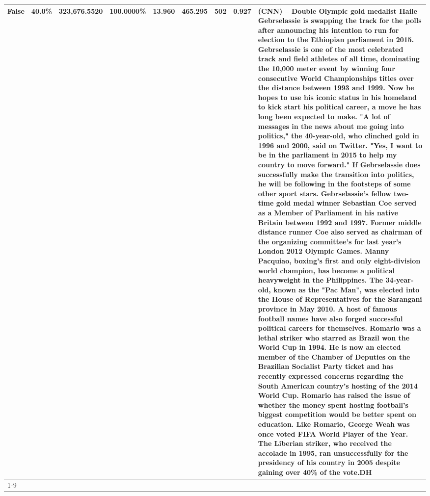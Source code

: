 \begin{table}[H]
{\begin{tabular}{lllrlllll}
False & 40.0\% & 323,676.5520 & \bfseries \color{red} 100.0000\% & 13.960 & 465.295 & 502 & 0.927 & (CNN) -- Double Olympic gold medalist Haile Gebrselassie is swapping the track for the polls after announcing his intention to run for election to the Ethiopian parliament in 2015. Gebrselassie is one of the most celebrated track and field athletes of all time, dominating the 10,000 meter event by winning four consecutive World Championships titles over the distance between 1993 and 1999. Now he hopes to use his iconic status in his homeland to kick start his political career, a move he has long been expected to make. "A lot of messages in the news about me going into politics," the 40-year-old, who clinched gold in 1996 and 2000, said on Twitter. "Yes, I want to be in the parliament in 2015 to help my country to move forward." If Gebrselassie does successfully make the transition into politics, he will be following in the footsteps of some other sport stars. Gebrselassie's fellow two-time gold medal winner Sebastian Coe served as a Member of Parliament in his native Britain between 1992 and 1997. Former middle distance runner Coe also served as chairman of the organizing committee's for last year's London 2012 Olympic Games. Manny Pacquiao, boxing's first and only eight-division world champion, has become a political heavyweight in the Philippines. The 34-year-old, known as the "Pac Man", was elected into the House of Representatives for the Sarangani province in May 2010. A host of famous football names have also forged successful political careers for themselves. Romario was a lethal striker who starred as Brazil won the World Cup in 1994. He is now an elected member of the Chamber of Deputies on the Brazilian Socialist Party ticket and has recently expressed concerns regarding the South American country's hosting of the 2014 World Cup. Romario has raised the issue of whether the money spent hosting football's biggest competition would be better spent on education. Like Romario, George Weah was once voted FIFA World Player of the Year. The Liberian striker, who received the accolade in 1995, ran unsuccessfully for the presidency of his country in 2005 despite gaining over 40\% of the vote.DH \\
\cline{1-9}

\end{tabular}}
\end{table}
